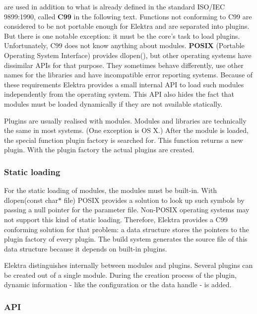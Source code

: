 are used in addition to what is already defined in the standard I\+S\+O/\+I\+E\+C 9899\+:1990, called {\bfseries C99} in the following text. Functions not conforming to C99 are considered to be not portable enough for Elektra and are separated into plugins. But there is one notable exception\+: it must be the core's task to load plugins. Unfortunately, C99 does not know anything about modules. {\bfseries P\+O\+S\+I\+X} (Portable Operating System Interface) provides {\ttfamily dlopen()}, but other operating systems have dissimilar A\+P\+Is for that purpose. They sometimes behave differently, use other names for the libraries and have incompatible error reporting systems. Because of these requirements Elektra provides a small internal A\+P\+I to load such modules independently from the operating system. This A\+P\+I also hides the fact that modules must be loaded dynamically if they are not available statically.

Plugins are usually realised with modules. Modules and libraries are technically the same in most systems. (One exception is O\+S X.) After the module is loaded, the special function plugin factory is searched for. This function returns a new plugin. With the plugin factory the actual plugins are created.

\subsubsection*{Static loading}

For the static loading of modules, the modules must be built-\/in. With {\ttfamily dlopen(const} {\ttfamily char$\ast$} {\ttfamily file)} P\+O\+S\+I\+X provides a solution to look up such symbols by passing a null pointer for the parameter {\ttfamily file}. Non-\/\+P\+O\+S\+I\+X operating systems may not support this kind of static loading. Therefore, Elektra provides a C99 conforming solution for that problem\+: a data structure stores the pointers to the plugin factory of every plugin. The build system generates the source file of this data structure because it depends on built-\/in plugins.

Elektra distinguishes internally between modules and plugins. Several plugins can be created out of a single module. During the creation process of the plugin, dynamic information -\/ like the configuration or the data handle -\/ is added.

\subsubsection*{A\+P\+I}

